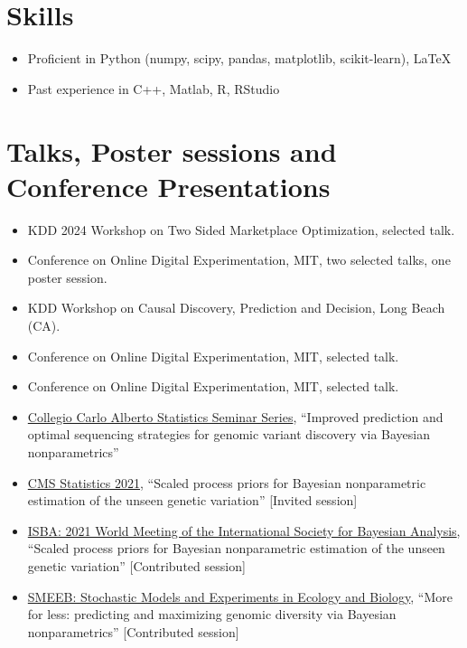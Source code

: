 \documentclass[10pt, a4paper]{article}
\newcommand{\years}[1]{\marginnote{\scriptsize #1}}
\begin{document}
\section*{Skills}
\begin{itemize}
	\item Proficient in Python (numpy, scipy, pandas, matplotlib, scikit-learn), \LaTeX
	\item Past experience in C++, Matlab, R, RStudio
\end{itemize}
\section*{Talks, Poster sessions and Conference Presentations}
\years{2024}
\begin{itemize}
	\item KDD 2024 Workshop on Two Sided Marketplace Optimization, selected talk.
	\item Conference on Online Digital Experimentation, MIT, two selected talks, one poster session.
\end{itemize}
\years{2023}
\begin{itemize}
	\item KDD Workshop on Causal Discovery, Prediction and Decision, Long Beach (CA).
	\item Conference on Online Digital Experimentation, MIT, selected talk.
\end{itemize}
\years{2022}
\begin{itemize}
	\item Conference on Online Digital Experimentation, MIT, selected talk.
\end{itemize}
\years{2021}
\begin{itemize}
	\item \href{https://www.carloalberto.org/event/lorenzo-masoero-amazon/}{Collegio Carlo Alberto Statistics Seminar Series}, ``{Improved prediction and optimal sequencing strategies for genomic variant discovery via Bayesian nonparametrics}''  
	\item \href{http://www.cmstatistics.org/CMStatistics2021/speakers.php}{CMS Statistics 2021}, ``{Scaled process priors for Bayesian nonparametric
estimation of the unseen genetic variation}'' [Invited session] 
	\item \href{https://events.stat.uconn.edu/ISBA2021/}{ISBA: 2021 World Meeting of the International Society for Bayesian Analysis}, ``{Scaled process priors for Bayesian nonparametric
estimation of the unseen genetic variation}'' [Contributed session] 
	\item \href{https://liphlab.github.io/SMEEB2021/}{SMEEB: Stochastic Models and Experiments in Ecology and Biology}, ``{More for less: predicting and maximizing genomic diversity via Bayesian nonparametrics}'' [Contributed session] 
\end{itemize}
\end{document}
